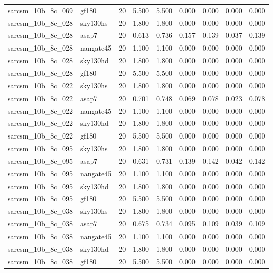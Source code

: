 \begin{tabular}{llrrrrrrr}
sarcsm\_10b\_8c\_069 & gf180 & 20 & 5.500 & 5.500 & 0.000 & 0.000 & 0.000 & 0.000 \\
sarcsm\_10b\_8c\_028 & sky130hs & 20 & 1.800 & 1.800 & 0.000 & 0.000 & 0.000 & 0.000 \\
sarcsm\_10b\_8c\_028 & asap7 & 20 & 0.613 & 0.736 & 0.157 & 0.139 & 0.037 & 0.139 \\
sarcsm\_10b\_8c\_028 & nangate45 & 20 & 1.100 & 1.100 & 0.000 & 0.000 & 0.000 & 0.000 \\
sarcsm\_10b\_8c\_028 & sky130hd & 20 & 1.800 & 1.800 & 0.000 & 0.000 & 0.000 & 0.000 \\
sarcsm\_10b\_8c\_028 & gf180 & 20 & 5.500 & 5.500 & 0.000 & 0.000 & 0.000 & 0.000 \\
sarcsm\_10b\_8c\_022 & sky130hs & 20 & 1.800 & 1.800 & 0.000 & 0.000 & 0.000 & 0.000 \\
sarcsm\_10b\_8c\_022 & asap7 & 20 & 0.701 & 0.748 & 0.069 & 0.078 & 0.023 & 0.078 \\
sarcsm\_10b\_8c\_022 & nangate45 & 20 & 1.100 & 1.100 & 0.000 & 0.000 & 0.000 & 0.000 \\
sarcsm\_10b\_8c\_022 & sky130hd & 20 & 1.800 & 1.800 & 0.000 & 0.000 & 0.000 & 0.000 \\
sarcsm\_10b\_8c\_022 & gf180 & 20 & 5.500 & 5.500 & 0.000 & 0.000 & 0.000 & 0.000 \\
sarcsm\_10b\_8c\_095 & sky130hs & 20 & 1.800 & 1.800 & 0.000 & 0.000 & 0.000 & 0.000 \\
sarcsm\_10b\_8c\_095 & asap7 & 20 & 0.631 & 0.731 & 0.139 & 0.142 & 0.042 & 0.142 \\
sarcsm\_10b\_8c\_095 & nangate45 & 20 & 1.100 & 1.100 & 0.000 & 0.000 & 0.000 & 0.000 \\
sarcsm\_10b\_8c\_095 & sky130hd & 20 & 1.800 & 1.800 & 0.000 & 0.000 & 0.000 & 0.000 \\
sarcsm\_10b\_8c\_095 & gf180 & 20 & 5.500 & 5.500 & 0.000 & 0.000 & 0.000 & 0.000 \\
sarcsm\_10b\_8c\_038 & sky130hs & 20 & 1.800 & 1.800 & 0.000 & 0.000 & 0.000 & 0.000 \\
sarcsm\_10b\_8c\_038 & asap7 & 20 & 0.675 & 0.734 & 0.095 & 0.109 & 0.039 & 0.109 \\
sarcsm\_10b\_8c\_038 & nangate45 & 20 & 1.100 & 1.100 & 0.000 & 0.000 & 0.000 & 0.000 \\
sarcsm\_10b\_8c\_038 & sky130hd & 20 & 1.800 & 1.800 & 0.000 & 0.000 & 0.000 & 0.000 \\
sarcsm\_10b\_8c\_038 & gf180 & 20 & 5.500 & 5.500 & 0.000 & 0.000 & 0.000 & 0.000 \\

\end{tabular}
